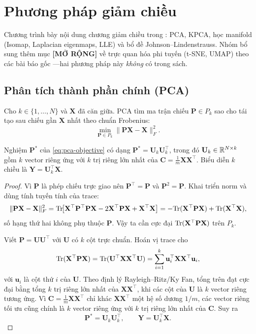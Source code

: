 \section{Phương pháp giảm chiều}

Chương trình bày nội dung chương giảm chiều trong \cite{mohri2018foundations}: PCA, KPCA, học manifold (Isomap, Laplacian eigenmaps, LLE) và bổ đề Johnson--Lindenstrauss. Nhóm bổ sung thêm mục \textbf{[MỞ RỘNG]} về trực quan hóa phi tuyến (t-SNE, UMAP) theo các bài báo gốc \cite{vandermaaten2008tsne,mcinnes2018umap}---hai phương pháp này \emph{không} có trong sách.

\subsection{Phân tích thành phần chính (PCA)}
\label{sec:pca}

Cho $k \in \{1,\ldots,N\}$ và $\mathbf{X}$ đã căn giữa. PCA tìm ma trận chiếu $\mathbf{P} \in P_k$ sao cho tái tạo sau chiếu gần $\mathbf{X}$ nhất theo chuẩn Frobenius:
\begin{equation}
\min_{\mathbf{P} \in P_k} \|\mathbf{P}\mathbf{X} - \mathbf{X}\|_F^2.
\label{eq:pca-objective}
\end{equation}

\begin{theorem}
\label{thm:pca}
Nghiệm $\mathbf{P}^*$ của \eqref{eq:pca-objective} có dạng $\mathbf{P}^* = \mathbf{U}_k\mathbf{U}_k^\top$, trong đó $\mathbf{U}_k \in \mathbb{R}^{N \times k}$ gồm $k$ vector riêng ứng với $k$ trị riêng lớn nhất của $\mathbf{C} = \frac{1}{m}\mathbf{X}\mathbf{X}^\top$. Biểu diễn $k$ chiều là $\mathbf{Y} = \mathbf{U}_k^\top \mathbf{X}$.
\end{theorem}

\begin{proof}
Vì $\mathbf{P}$ là phép chiếu trực giao nên $\mathbf{P}^\top = \mathbf{P}$ và $\mathbf{P}^2 = \mathbf{P}$. Khai triển norm và dùng tính tuyến tính của trace:
\[
\|\mathbf{P}\mathbf{X} - \mathbf{X}\|_F^2
= \mathrm{Tr}\!\bigl[\mathbf{X}^\top\mathbf{P}^\top\mathbf{P}\mathbf{X} - 2\mathbf{X}^\top\mathbf{P}\mathbf{X} + \mathbf{X}^\top\mathbf{X}\bigr]
= -\mathrm{Tr}(\mathbf{X}^\top\mathbf{P}\mathbf{X}) + \mathrm{Tr}(\mathbf{X}^\top\mathbf{X}),
\]
số hạng thứ hai không phụ thuộc $\mathbf{P}$. Vậy ta cần cực đại $\mathrm{Tr}(\mathbf{X}^\top\mathbf{P}\mathbf{X})$ trên $P_k$.

Viết $\mathbf{P} = \mathbf{U}\mathbf{U}^\top$ với $\mathbf{U}$ có $k$ cột trực chuẩn. Hoán vị trace cho
\[
\mathrm{Tr}(\mathbf{X}^\top\mathbf{P}\mathbf{X})
= \mathrm{Tr}(\mathbf{U}^\top\mathbf{X}\mathbf{X}^\top\mathbf{U})
= \sum_{i=1}^k \mathbf{u}_i^\top \mathbf{X}\mathbf{X}^\top \mathbf{u}_i,
\]
với $\mathbf{u}_i$ là cột thứ $i$ của $\mathbf{U}$. Theo định lý Rayleigh--Ritz/Ky Fan, tổng trên đạt cực đại bằng tổng $k$ trị riêng lớn nhất của $\mathbf{X}\mathbf{X}^\top$, khi các cột của $\mathbf{U}$ là $k$ vector riêng tương ứng. Vì $\mathbf{C}=\frac{1}{m}\mathbf{X}\mathbf{X}^\top$ chỉ khác $\mathbf{X}\mathbf{X}^\top$ một hệ số dương $1/m$, các vector riêng tối ưu cũng chính là $k$ vector riêng ứng với $k$ trị riêng lớn nhất của $\mathbf{C}$. Suy ra
\[
\mathbf{P}^* = \mathbf{U}_k\mathbf{U}_k^\top,\qquad \mathbf{Y}=\mathbf{U}_k^\top \mathbf{X}.
\]
\end{proof}

